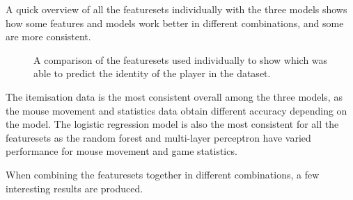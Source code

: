 \documentclass[Report.tex]{subfiles}
\newcommand{\newaxis}[7]{
\begin{axis}[
    ybar,
    title={#1},
    ymin=#3, ymax=#4,
    bar width=1em,
    width={#5},
    height={#6},
    legend style={at={#7},anchor=north,legend columns=-1},
    enlarge x limits=0.4,
    x tick label style={align=center,text width=2cm},
    symbolic x coords={Logistic Regression, Random Forest, Multi-layer Perceptron},
    xtick=data,
    ylabel={#2}
]
}
\newcommand{\plotbar}[3] {
\addplot+[
	discard if not={features}{#1},
] table [x=model, y=#2, col sep=comma] {data/15-game-cv.csv};
\addlegendentry{#3}
}
\begin{document}
A quick overview of all the featuresets individually with the three models shows how some features and models work better in different combinations, and some are more consistent. 

\begin{figure}[H]
\centering
{}
\caption{A comparison of the featuresets used individually to show which was able to predict the identity of the player in the dataset. }
\end{figure}

The itemisation data is the most consistent overall among the three models, as the mouse movement and statistics data obtain different accuracy depending on the model. The logistic regression model is also the most consistent for all the featuresets as the random forest and multi-layer perceptron have varied performance for mouse movement and game statistics. 


When combining the featuresets together in different combinations, a few interesting results are produced. 
\end{document}
